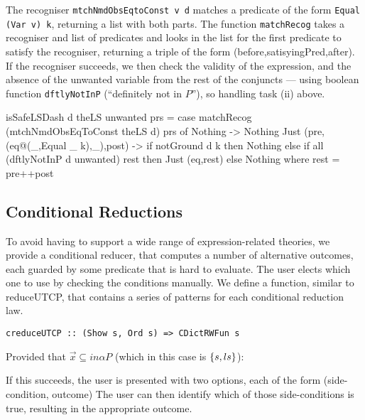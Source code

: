 The recogniser \texttt{mtchNmdObsEqtoConst v d} matches a predicate of the form
\texttt{Equal (Var v) k}, returning a list with both parts.
The function \texttt{matchRecog} takes a recogniser and list of predicates
and looks in the list for the first predicate to satisfy
the recogniser, returning a triple of the form
(before,satisyingPred,after).
If the recogniser succeeds,
we then check the validity of the expression,
and the absence of the unwanted variable from the
rest of the conjuncts --- using boolean function
 \texttt{dftlyNotInP} (``definitely not in $P$''),
 so handling task (ii) above.
\begin{code}
isSafeLSDash d theLS unwanted prs
 = case matchRecog (mtchNmdObsEqToConst theLS d) prs of
    Nothing -> Nothing
    Just (pre,(eq@(_,Equal _ k),_),post) ->
     if notGround d k
      then Nothing
      else if all (dftlyNotInP d unwanted) rest
       then Just (eq,rest)
       else Nothing
     where rest = pre++post
\end{code}

\subsection{Conditional Reductions}

To avoid having to support a wide range of expression-related theories,
we provide a conditional reducer, that computes
a number of alternative outcomes, each guarded by some predicate
that is hard to evaluate.
The user elects which one to use by checking the conditions manually.
We define a function, similar to reduceUTCP,
that contains a series of patterns for each conditional reduction law.
\begin{verbatim}
creduceUTCP :: (Show s, Ord s) => CDictRWFun s
\end{verbatim}
Provided that $\vec x \subseteq in\alpha P$
 (which in this case is $\{{s,ls}\}$):
If this succeeds, the user is presented with two options,
each of the form (side-condition, outcome)
The user can then identify which of those side-conditions is true,
resulting in the appropriate outcome.

